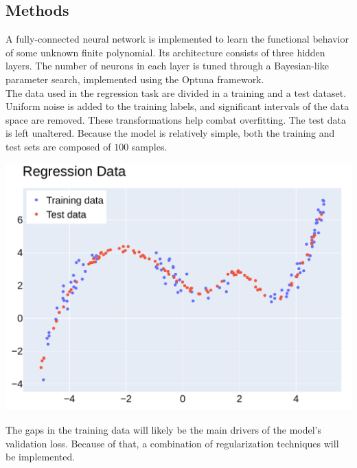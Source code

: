 \documentclass[11pt]{article} %
\newenvironment{Figure}{\par\medskip\noindent\minipage{\linewidth}}{\endminipage\par\medskip}
\begin{document}
\begin{multicols}{2}
\subsection{Methods}

A fully-connected neural network is implemented to learn the functional behavior of some unknown finite polynomial. Its architecture consists of three hidden layers. The number of neurons in each layer is tuned through a Bayesian-like parameter search, implemented using the Optuna framework.\\

\noindent The data used in the regression task are divided in a training and a test dataset. Uniform noise is added to the training labels, and significant intervals of the data space are removed. These transformations help combat overfitting. The test data is left unaltered. Because the model is relatively simple, both the training and test sets are composed of $100$ samples.
\begin{Figure}
	\centering
	\includegraphics[width=\linewidth]{res/fig0.pdf}
\end{Figure}

\noindent The gaps in the training data will likely be the main drivers of the model's validation loss. Because of that, a combination of regularization techniques will be implemented.\\


\end{multicols}
\end{document}
